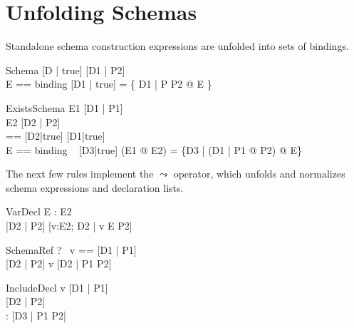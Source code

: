 \documentclass{article}
\newcommand{\unfoldsTo}{\mathrel{\leadsto}}
\newcommand{\schemaminus}{\mathbin{\textbf{schemaminus}}}
\begin{document}


\section{Unfolding Schemas}

Standalone schema construction expressions are unfolded
into sets of bindings.

\begin{zedrule}{Schema}
  [D | true] \unfoldsTo [D1 | P2] \\
  \proviso E == binding [D1 | true]
\derives
  [D | P] = \{ D1 | P \land P2 @ E \}
\end{zedrule}

\begin{zedrule}{ExistsSchema}
   E1 \unfoldsTo [D1 | P1] \\
   E2 \unfoldsTo [D2 | P2] \\
   \proviso [D3|true] == [D2|true] \schemaminus [D1|true] \\
   \proviso E == binding ~ [D3|true]
\derives
   (\exists E1 @ E2) = \{D3 | (\exists D1 | P1 @ P2) @ E\}
\end{zedrule}

The next few rules implement the $\unfoldsTo$ operator,
which unfolds and normalizes schema expressions and 
declaration lists.
\begin{zedrule}{VarDecl}
   \proviso E : \power E2 \\
   [D1 | true] \unfoldsTo [D2 | P2]
\derives
   [v:E; D1 | true] \unfoldsTo [v:E2; D2 |  v \in E \land P2]
\end{zedrule}

\begin{zedrule}{SchemaRef}
  \proviso ?~ v == [D1 | P1] \\
  [D1 | true] \unfoldsTo [D2 | P2]
\derives
  v \unfoldsTo [D2 | P1 \land P2]
\end{zedrule}


\begin{zedrule}{IncludeDecl}
   v \unfoldsTo [D1 | P1] \\
   [D | true] \unfoldsTo [D2 | P2] \\
   \proviso [D1 | true] \land [D2 | true] : \power [D3]
\derives
   [v; D | true] \unfoldsTo [D3 |  P1 \land P2]
\end{zedrule}
\end{document}
